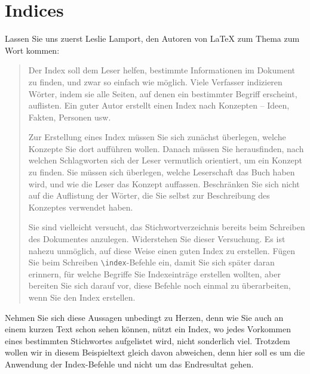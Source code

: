 \documentclass[11pt, a4paper]{article}
\newcommand{\ltx}{\LaTeX}
\begin{document}
\section{Indices}
Lassen Sie uns zuerst Leslie Lamport, den Autoren von \ltx{} zum Thema zum Wort kommen:
\begin{quote}
Der Index soll dem Leser helfen, bestimmte Informationen im Dokument zu finden, und zwar so einfach wie möglich. Viele Verfasser indizieren Wörter, indem sie alle Seiten, auf denen ein bestimmter Begriff erscheint, auflisten. Ein guter Autor erstellt einen Index nach Konzepten -- Ideen, Fakten, Personen usw.

Zur Erstellung eines Index müssen Sie sich zunächst überlegen, welche Konzepte Sie dort aufführen wollen. Danach müssen Sie herausfinden, nach welchen Schlagworten sich der Leser vermutlich orientiert, um ein Konzept zu finden. Sie müssen sich überlegen, welche Leserschaft das Buch haben wird, und wie die Leser das Konzept auffassen. Beschränken Sie sich nicht auf die Auflistung der Wörter, die Sie selbst zur Beschreibung des Konzeptes verwendet haben.

Sie sind vielleicht versucht, das Stichwortverzeichnis bereits beim Schreiben des Dokumentes anzulegen. Widerstehen Sie dieser Versuchung. Es ist nahezu unmöglich, auf diese Weise einen guten Index zu erstellen. Fügen Sie beim Schreiben \verb+\index+-Befehle ein, damit Sie sich später daran erinnern, für welche Begriffe Sie Indexeinträge erstellen wollten, aber bereiten Sie sich darauf vor, diese Befehle noch einmal zu überarbeiten, wenn Sie den Index erstellen.
\end{quote}
Nehmen Sie sich diese Aussagen unbedingt zu Herzen\cite{dlb}, denn wie Sie auch an einem kurzen Text schon sehen können, nützt ein Index, wo jedes Vorkommen eines bestimmten Stichwortes aufgelistet wird, nicht sonderlich viel. Trotzdem wollen wir in diesem Beispieltext gleich davon abweichen, denn hier soll es um die Anwendung der Index-Befehle und nicht um das Endresultat gehen.
\end{document}
